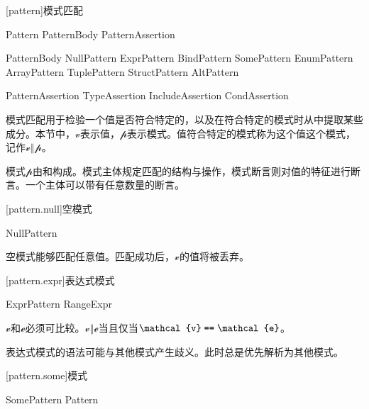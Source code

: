 
[pattern]{模式匹配}

\begin{bnf}{Pattern}
    PatternBody PatternAssertion\bnfs
\end{bnf}

\begin{bnf}{PatternBody}
    NullPattern \br
    ExprPattern \br
    BindPattern \br
    SomePattern \br
    EnumPattern \br
    ArrayPattern \br
    TuplePattern \br
    StructPattern \br
    AltPattern
\end{bnf}

\begin{bnf}{PatternAssertion}
    TypeAssertion \br
    IncludeAssertion \br
    CondAssertion
\end{bnf}

\pnum
模式匹配用于检验一个值是否符合特定的，以及在符合特定的模式时从中提取某些成分。本节中，$\mathcal{v}$表示值，$\mathcal{p}$表示模式。值符合特定的模式称为这个值这个模式，记作$\mathcal{v}\mathrel{\Vert}\mathcal{p}$。

\pnum
模式$\mathcal{p}$由和构成。模式主体规定匹配的结构与操作，模式断言则对值的特征进行断言。一个主体可以带有任意数量的断言。

[pattern.null]{空模式}

\begin{bnf}{NullPattern}
    \tcode{_}
\end{bnf}

\pnum
空模式能够匹配任意值。匹配成功后，$\mathcal{v}$的值将被丢弃。

[pattern.expr]{表达式模式}

\begin{bnf}{ExprPattern}
    RangeExpr
\end{bnf}

\pnum
$\mathcal{v}$和$\mathcal{e}$必须可比较。$\mathcal{v}\mathrel{\Vert}\mathcal{e}$当且仅当$\mathcal{v}\mathrel{\tcode{==}}\mathcal{e}$。

\pnum
\enternote 表达式模式的语法可能与其他模式产生歧义。此时总是优先解析为其他模式。 \exitnote

[pattern.some]{模式}

\begin{bnf}{SomePattern}
     Pattern
\end{bnf}

